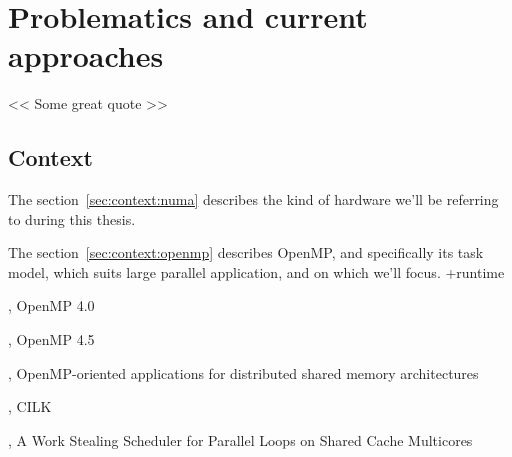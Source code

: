 \part{Problematics and current approaches}

\begin{savequote}[6cm]
<< Some great quote  >>
\end{savequote}
\chapter{Context}
\chaptertoc

The section~\ref{sec:context:numa} describes the kind of hardware we'll be referring to during this thesis.

The section~\ref{sec:context:openmp} describes OpenMP, and specifically its task model, which suits large parallel application, and on which we'll focus.
+runtime







\cite{openmp40}, OpenMP 4.0

\cite{openmp45}, OpenMP 4.5

\cite{Marowka2004}, OpenMP-oriented applications for distributed shared memory architectures

\cite{cilk5}, CILK

\cite{Tchiboukdjian2010}, A Work Stealing Scheduler for Parallel Loops on Shared Cache Multicores

